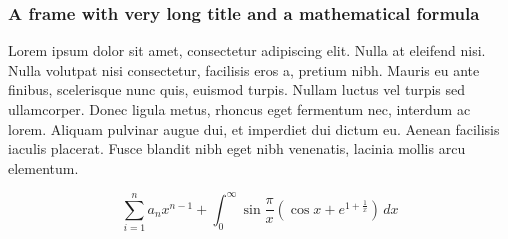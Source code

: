 \documentclass{beamer}
\begin{document}
\begin{frame}
	\frametitle{A frame with very long title and a mathematical formula}
	
Lorem ipsum dolor sit amet, consectetur adipiscing elit. Nulla at eleifend nisi. Nulla volutpat nisi consectetur, facilisis eros a, pretium nibh. Mauris eu ante finibus, scelerisque nunc quis, euismod turpis. Nullam luctus vel turpis sed ullamcorper. Donec ligula metus, rhoncus eget fermentum nec, interdum ac lorem. Aliquam pulvinar augue dui, et imperdiet dui dictum eu. Aenean facilisis iaculis placerat. Fusce blandit nibh eget nibh venenatis, lacinia mollis arcu elementum.

$$ \sum_{i=1}^n a_n x^{n-1} + \int_0^\infty \sin\frac{\pi}{x} \left ( \cos x + e^{1 + \frac{1}{x}} \right ) \, dx	$$
		
\end{frame}	
\end{document}
